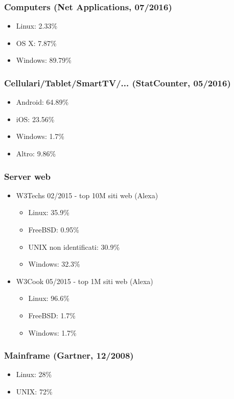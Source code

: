 \documentclass[t,aspectratio=169]{beamer}
\begin{document}
\begin{frame}
    \frametitle{Computers (Net Applications, 07/2016)}
    \begin{itemize}
        \item<2-> Linux: 2.33\%
        \item<2-> OS X: 7.87\%
        \item<2-> Windows: 89.79\%
    \end{itemize}
\end{frame}

\begin{frame}
    \frametitle{Cellulari/Tablet/SmartTV/... (StatCounter, 05/2016)}
    \begin{itemize}
        \item<2-> Android: 64.89\%
        \item<2-> iOS: 23.56\%
        \item<2-> Windows: 1.7\%
        \item<2-> Altro: 9.86\%
    \end{itemize}
\end{frame}

\begin{frame}
    \frametitle{Server web}
    \begin{itemize}
    \item<2-> W3Techs 02/2015 - top 10M siti web (Alexa)
        \begin{itemize}
            \item<3-> Linux: 35.9\%
            \item<3-> FreeBSD: 0.95\%
            \item<3-> UNIX non identificati: 30.9\%
            \item<3-> Windows: 32.3\%
        \end{itemize}
    \item<4-> W3Cook 05/2015 - top 1M siti web (Alexa)
        \begin{itemize}
            \item<5-> Linux: 96.6\%
            \item<5-> FreeBSD: 1.7\%
            \item<5-> Windows: 1.7\%
        \end{itemize}
    \end{itemize}
\end{frame}

\begin{frame}
    \frametitle{Mainframe (Gartner, 12/2008)}
    \begin{itemize}
        \item<2-> Linux: 28\%
        \item<2-> UNIX: 72\%
    \end{itemize}
\end{frame}
\end{document}
